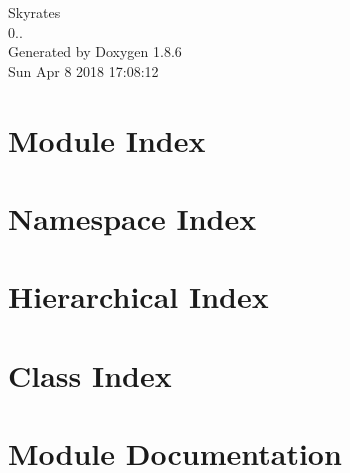 \documentclass[twoside]{book}
\newcommand{\clearemptydoublepage}{%
  \newpage{\pagestyle{empty}\cleardoublepage}%
}
\begin{document}
\hypersetup{pageanchor=false}
\begin{titlepage}
\vspace*{7cm}
\begin{center}%
{\Large Skyrates \\[1ex]\large 0.. }\\
\vspace*{1cm}
{\large Generated by Doxygen 1.8.6}\\
\vspace*{0.5cm}
{\small Sun Apr 8 2018 17:08:12}\\
\end{center}
\end{titlepage}
\clearemptydoublepage
\tableofcontents
\clearemptydoublepage
{}
\hypersetup{pageanchor=true}

\chapter{Module Index}

\chapter{Namespace Index}

\chapter{Hierarchical Index}

\chapter{Class Index}

\chapter{Module Documentation}




\end{document}
